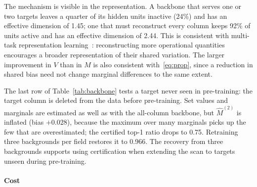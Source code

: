 The mechanism is visible in the representation. A backbone that serves one or two targets leaves a
quarter of its hidden units inactive (24\%) and has an effective dimension of 1.45; one that must
reconstruct every column keeps 92\% of units active and has an effective dimension of 2.44. This is consistent with multi-task representation learning~\cite{caruana1997multitask,baxter2000inductive,maurer2016benefit}: reconstructing more operational quantities encourages a broader representation of their shared variation. The larger improvement in $V$ than in $M$ is also consistent with~\eqref{eq:prop}, since a reduction in shared bias need not change marginal differences to the same extent.

The last row of Table~\ref{tab:backbone} tests a target never seen in pre-training: the target
column is deleted from the data before pre-training. Set values and marginals are estimated as well
as with the all-column backbone, but $\hat M^{(2)}$ is inflated (bias $+0.028$), because the
maximum over many marginals picks up the few that are overestimated; the certified top-1 ratio drops
to 0.75. Retraining three backgrounds per field restores it to 0.966. The recovery from three backgrounds supports using certification when extending the scan to targets unseen during pre-training.



\paragraph{Cost}

